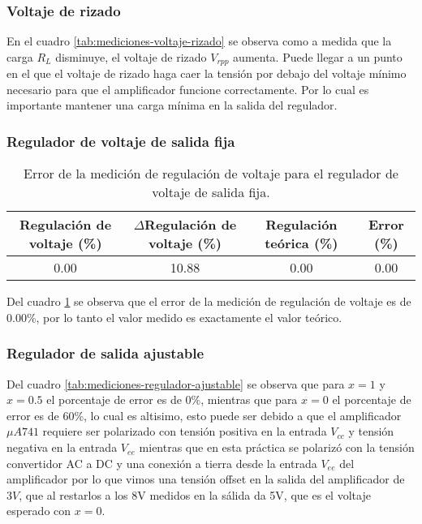 \subsubsection{Voltaje de rizado}

En el cuadro \ref{tab:mediciones-voltaje-rizado} se observa como a medida que la carga $R_L$ disminuye, el voltaje de rizado $V_{rpp}$ aumenta. Puede llegar a un punto en el que el voltaje de rizado haga caer la tensión por debajo del voltaje mínimo necesario para que el amplificador funcione correctamente. Por lo cual es importante mantener una carga mínima en la salida del regulador.

\subsubsection{Regulador de voltaje de salida fija}
\begin{table}[h!]
    \centering
    \begin{tabular}{|c|c|c|c|}
        \hline
        Regulación de voltaje (\%) & $\Delta$Regulación de voltaje (\%) & Regulación teórica (\%) & Error (\%) \\
        \hline
        0.00 & 10.88 & 0.00 & 0.00 \\
        \hline
    \end{tabular}
    \caption{Error de la medición de regulación de voltaje para el regulador de voltaje de salida fija.}
    \label{tab:error-mediciones-regulacion-voltaje-fija}
\end{table}

Del cuadro \ref{tab:error-mediciones-regulacion-voltaje-fija} se observa que el error de la medición de regulación de voltaje es de 0.00\%, por lo tanto el valor medido es exactamente el valor teórico.

\subsubsection{Regulador de salida ajustable}

Del cuadro \ref{tab:mediciones-regulador-ajustable} se observa que para $x=1$ y $x=0.5$ el porcentaje de error es de 0\%, mientras que para $x=0$ el porcentaje de error es de 60\%, lo cual es altisimo, esto puede ser debido a que el amplificador $\mu A741$ requiere ser polarizado con tensión positiva en la entrada $V_{cc}$ y tensión negativa en la entrada $V_{ee}$ mientras que en esta práctica se polarizó con la tensión convertidor AC a DC y una conexión a tierra desde la entrada $V_{ee}$ del amplificador por lo que vimos una tensión offset en la salida del amplificador de $3 V$, que al restarlos a los 8V medidos en la sálida da 5V, que es el voltaje esperado con $x=0$.


